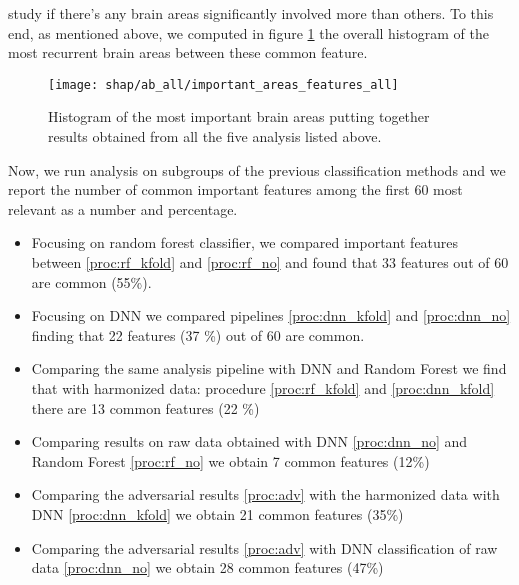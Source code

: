 \documentclass[11pt]{report}
\begin{document}
study if there's any brain areas significantly involved more than others. To this end, as mentioned above, we computed in figure \ref{fig:important_areas_features_all} the overall histogram of the most recurrent brain areas between these common feature.

\begin{figure}[h]
\centering
  \texttt{[image: shap/ab\_all/important\_areas\_features\_all]}
\caption{Histogram of the most important brain areas putting together results obtained from all the five analysis listed above.}
\label{fig:important_areas_features_all}
\end{figure}





\hfill

Now, we run analysis on subgroups of the previous classification methods and we report the number of common important features among the first 60 most relevant as a number and percentage.

\begin{itemize}
\item Focusing on random forest classifier, we compared important features between \ref{proc:rf_kfold} and \ref{proc:rf_no} and found that 33 features out of 60 are common (55\%).
\item Focusing on DNN we compared pipelines \ref{proc:dnn_kfold} and \ref{proc:dnn_no} finding that 22 features (37 \%) out of 60 are common.
\item Comparing the same analysis pipeline with DNN and Random Forest we find that with harmonized data: procedure \ref{proc:rf_kfold} and \ref{proc:dnn_kfold} there are 13 common features (22 \%)
\item Comparing results on raw data obtained with DNN \ref{proc:dnn_no} and Random Forest \ref{proc:rf_no} we obtain 7 common features  (12\%)
\item Comparing the adversarial results \ref{proc:adv} with the harmonized data with DNN \ref{proc:dnn_kfold} we obtain 21 common features (35\%)
\item Comparing the adversarial results \ref{proc:adv} with DNN classification of raw data \ref{proc:dnn_no} we obtain 28 common features (47\%)
\end{itemize}








\newpage
\end{document}
